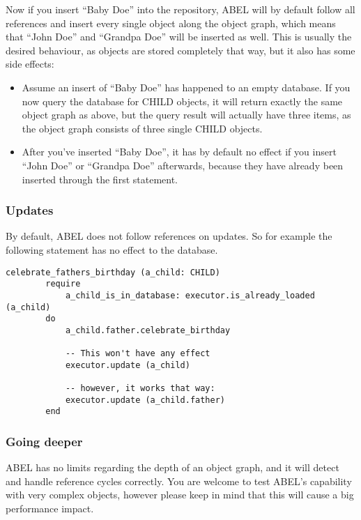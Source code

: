 Now if you insert ``Baby Doe'' into the repository, ABEL will by default follow all references and insert every single object along the object graph, which means that ``John Doe'' and ``Grandpa Doe'' will be inserted as well.
This is usually the desired behaviour, as objects are stored completely that way, but it also has some side effects:

\begin{itemize}
\item Assume an insert of ``Baby Doe'' has happened to an empty database. 
If you now query the database for CHILD objects, it will return exactly the same object graph as above, but the query result will actually have three items, as the object graph consists of three single CHILD objects.
	
\item After you've inserted ``Baby Doe'', it has by default no effect if you insert ``John Doe'' or ``Grandpa Doe'' afterwards, because they have already been inserted through the first statement.
\end{itemize}

\subsubsection{Updates}

By default, ABEL does not follow references on updates. So for example the following statement has no effect to the database.

\begin{lstlisting}[language=OOSC2Eiffel, captionpos=b, caption={}, label={lst:reference_update}]
	celebrate_fathers_birthday (a_child: CHILD)
		require
			a_child_is_in_database: executor.is_already_loaded (a_child)
		do
			a_child.father.celebrate_birthday

			-- This won't have any effect
			executor.update (a_child)

			-- however, it works that way:
			executor.update (a_child.father)
		end
\end{lstlisting}

\subsubsection{Going deeper}

ABEL has no limits regarding the depth of an object graph, and it will detect and handle reference cycles correctly. 
You are welcome to test ABEL's capability with very complex objects, however please keep in mind that this will cause a big performance impact.

